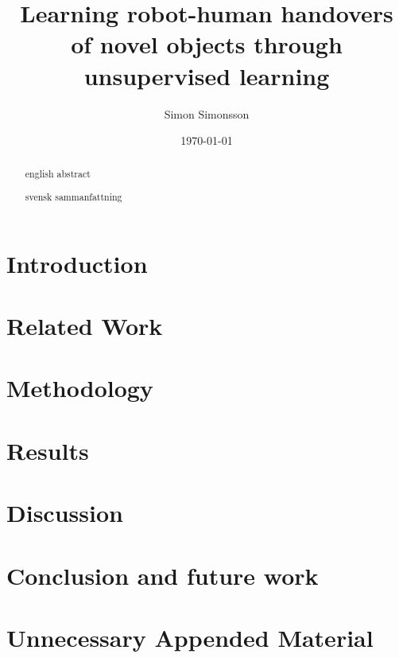 \documentclass{kththesis}
\title{Learning robot-human handovers of novel objects through unsupervised learning}
\author{Simon Simonsson}
\date{\today}
\begin{document}
\frontmatter

\titlepage

\begin{abstract}
	english abstract
\end{abstract}


\begin{otherlanguage}{swedish}
	\begin{abstract}
		svensk sammanfattning
	\end{abstract}
\end{otherlanguage}


\tableofcontents


\mainmatter


\chapter{Introduction}



\chapter{Related Work}



\chapter{Methodology}



\chapter{Results}


\chapter{Discussion}


\chapter{Conclusion and future work}


\printbibliography[heading=bibintoc] %

\appendix

\chapter{Unnecessary Appended Material}
\end{document}
